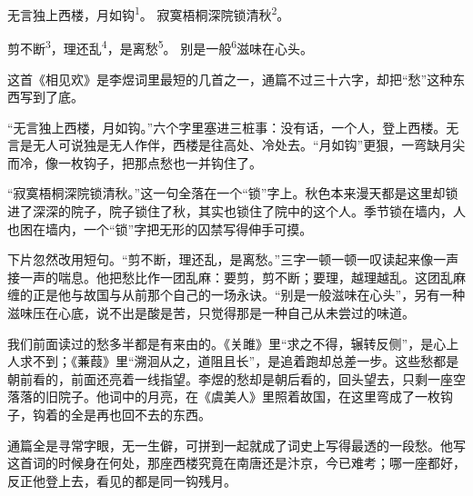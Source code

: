 
\begin{poem}
无言独上西楼，月如钩\textsuperscript{1}。
寂寞梧桐深院锁清秋\textsuperscript{2}。

剪不断\textsuperscript{3}，理还乱\textsuperscript{4}，是离愁\textsuperscript{5}。
别是一般\textsuperscript{6}滋味在心头。
\end{poem}

\begin{annotations}
\end{annotations}

\begin{appreciation}
这首《相见欢》是李煜词里最短的几首之一，通篇不过三十六字，却把“愁”这种东西写到了底。

“无言独上西楼，月如钩。”六个字里塞进三桩事：没有话，一个人，登上西楼。无言是无人可说独是无人作伴，西楼是往高处、冷处去。“月如钩”更狠，一弯缺月尖而冷，像一枚钩子，把那点愁也一并钩住了。

“寂寞梧桐深院锁清秋。”这一句全落在一个“锁”字上。秋色本来漫天都是这里却锁进了深深的院子，院子锁住了秋，其实也锁住了院中的这个人。季节锁在墙内，人也困在墙内，一个“锁”字把无形的囚禁写得伸手可摸。

下片忽然改用短句。“剪不断，理还乱，是离愁。”三字一顿一顿一叹读起来像一声接一声的喘息。他把愁比作一团乱麻：要剪，剪不断；要理，越理越乱。这团乱麻缠的正是他与故国与从前那个自己的一场永诀。“别是一般滋味在心头”，另有一种滋味压在心底，说不出是酸是苦，只觉得那是一种自己从未尝过的味道。

我们前面读过的愁多半都是有来由的。《关雎》里“求之不得，辗转反侧”，是心上人求不到；《蒹葭》里“溯洄从之，道阻且长”，是追着跑却总差一步。这些愁都是朝前看的，前面还亮着一线指望。李煜的愁却是朝后看的，回头望去，只剩一座空落落的旧院子。他词中的月亮，在《虞美人》里照着故国，在这里弯成了一枚钩子，钩着的全是再也回不去的东西。

通篇全是寻常字眼，无一生僻，可拼到一起就成了词史上写得最透的一段愁。他写这首词的时候身在何处，那座西楼究竟在南唐还是汴京，今已难考；哪一座都好，反正他登上去，看见的都是同一钩残月。
\end{appreciation}
